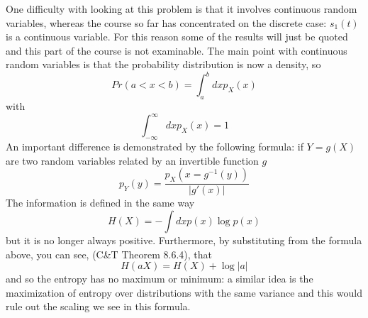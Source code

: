 \documentclass[12pt]{article}
\begin{document}
One difficulty with looking at this problem is that it involves
continuous random variables, whereas the course so far has
concentrated on the discrete case: $s_1(t)$ is a continuous
variable. For this reason some of the results will just be quoted and
this part of the course is not examinable. The main point with
continuous random variables is that the probability distribution is now a density, so
\begin{equation}
Pr(a<x<b)=\int_a^b dx p_X(x)
\end{equation}
with 
\begin{equation}
\int_{-\infty}^{\infty} dx p_X(x)=1
\end{equation}
An important difference is demonstrated by the following formula: if
$Y=g(X)$ are two random variables related by an invertible function
$g$
\begin{equation}
p_Y(y)=\frac{p_X(x=g^{-1}(y))}{|g'(x)|}
\end{equation}
The information is defined in the same way
\begin{equation}
H(X)=-\int dx p(x)\log{p(x)}
\end{equation}
but it is no longer always positive. Furthermore, by substituting from the formula above, you can see, (C\&T Theorem 8.6.4), that
\begin{equation}
H(aX)=H(X)+\log{|a|}
\end{equation}
and so the entropy has no maximum or minimum: a similar idea is the
maximization of entropy over distributions with the same variance and
this would rule out the scaling we see in this formula.
\end{document}
